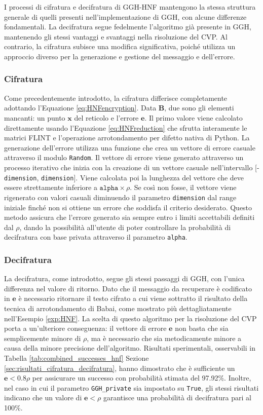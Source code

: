 I processi di cifratura e decifratura di GGH-HNF mantengono la stessa struttura generale 
di quelli presenti nell'implementazione di GGH, con alcune differenze fondamentali. 
La decifratura segue 
fedelmente l'algoritmo già presente in GGH, mantenendo gli stessi vantaggi e svantaggi
nella risoluzione del CVP. Al contrario, la cifratura subisce una modifica significativa, 
poiché utilizza un approccio diverso per la generazione e gestione del messaggio e 
dell'errore.

\subsubsection{Cifratura}

Come precedentemente introdotto, la cifratura differisce completamente adottando 
l'Equazione \ref{eq:HNFencryption}. Data $\mathbf{B}$, due sono gli elementi mancanti: un punto $\mathbf{x}$ 
del reticolo e l'errore $\mathbf{e}$. Il primo valore viene calcolato direttamente usando
l'Equazione \ref{eq:HNFreduction}  che sfrutta interamente le matrici FLINT e l'operazione 
arrotondamento per difetto nativa di Python. 
La generazione dell'errore utilizza una funzione che crea un vettore di errore casuale
attraverso il modulo \texttt{Random}. Il vettore di errore viene generato attraverso un processo 
iterativo che inizia con la creazione di un vettore casuale nell'intervallo 
[-\texttt{dimension}, \texttt{dimension}]. Viene calcolata poi la lunghezza del vettore che 
deve essere strettamente inferiore a $\texttt{alpha}\times\rho$. Se così non fosse, il vettore 
viene rigenerato con valori casuali diminuendo il parametro \texttt{dimension} dal range 
iniziale finché non si ottiene un errore che soddisfa il criterio desiderato. 
Questo metodo assicura che l'errore generato sia sempre entro i limiti accettabili definiti
dal $\rho$, dando la possibilità all'utente di poter controllare la probabilità di decifratura
con base privata attraverso il parametro \texttt{alpha}.
\subsubsection{Decifratura}

La decifratura, come introdotto, segue gli stessi passaggi di GGH, con l'unica differenza 
nel valore di ritorno. Dato che il messaggio da recuperare è codificato in $\mathbf{e}$ è
necessario ritornare il testo cifrato a cui viene sottratto il risultato della tecnica
di arrotondamento di Babai, come mostrato più dettagliatamente nell'Esempio \ref{exp:HNF}. 
La scelta di questo algoritmo per la risoluzione del CVP porta a un'ulteriore conseguenza:
il vettore di errore $\mathbf{e}$ non basta che sia semplicemente minore di $\rho$, 
ma è necessario che sia metodicamente minore a causa della minore precisione dell'algoritmo. 
Risultati sperimentali, osservabili in Tabella \ref{tab:combined_successes_hnf} Sezione 
\ref{sec:risultati_cifratura_decifratura}, hanno dimostrato che è sufficiente un 
$\mathbf{e} < 0.8\rho$ per assicurare un successo con probabilità stimata del 97.92\%. 
Inoltre, nel caso in cui il parametro \texttt{GGH\_private} sia impostato su \texttt{True}, 
gli stessi risultati indicano che un valore di $\mathbf{e} < \rho$ garantisce una probabilità di 
decifratura pari al 100\%.
